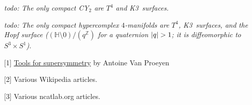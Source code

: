 \documentclass[10pt,letterpaper]{article}
\newcommand{\todo}[1]{\emph{todo: #1}}
\newcommand{\ZZ}{\mathbb{Z}} %
\newcommand{\HH}{\mathbb{H}} %
\DeclarePairedDelimiter{\abs}{\lvert}{\rvert}
\begin{document}
\todo{The only compact CY$_2$ are $T^4$ and K3~surfaces.}

\todo{The only compact hypercomplex $4$-manifolds are $T^4$,
  K3~surfaces, and the Hopf surface ($(\HH\setminus 0)/(q^\ZZ)$ for a
  quaternion $\abs{q}>1$; it is diffeomorphic to $S^3\times S^1$).}





\bigskip
\vfill
\setlength{\parindent}{0pt}



[1] \href{http://arxiv.org/abs/hep-th/9910030}{Tools for supersymmetry} by Antoine Van Proeyen

[2] Various Wikipedia articles.

[3] Various ncatlab.org articles.
\end{document}

